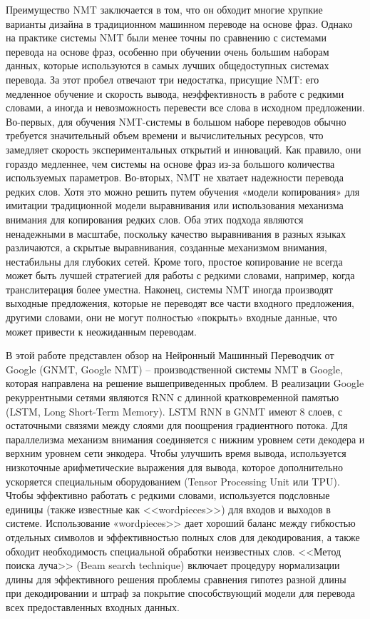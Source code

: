 \documentclass[12pt, a4paper]{article}
\begin{document}
        Преимущество NMT заключается в том, что он обходит многие хрупкие варианты дизайна в традиционном машинном переводе на основе фраз. Однако на практике системы NMT были менее точны по сравнению с системами перевода на основе фраз, особенно при обучении очень большим наборам данных, которые используются в самых лучших общедоступных системах перевода. За этот пробел отвечают три недостатка, присущие NMT: его медленное обучение и скорость вывода, неэффективность в работе с редкими словами, а иногда и невозможность перевести все слова в исходном предложении. Во-первых, для обучения NMT-системы в большом наборе переводов обычно требуется значительный объем времени и вычислительных ресурсов, что замедляет скорость экспериментальных открытий и инноваций. Как правило, они гораздо медленнее, чем системы на основе фраз из-за большого количества используемых параметров. Во-вторых, NMT не хватает надежности перевода редких слов. Хотя это можно решить путем обучения «модели копирования» для имитации традиционной модели выравнивания или использования механизма внимания для копирования редких слов. Оба этих подхода являются ненадежными в масштабе, поскольку качество выравнивания в разных языках различаются, а скрытые выравнивания, созданные механизмом внимания, нестабильны для глубоких сетей. Кроме того, простое копирование не всегда может быть лучшей стратегией для работы с редкими словами, например, когда транслитерация более уместна. Наконец, системы NMT иногда производят выходные предложения, которые не переводят все части входного предложения, другими словами, они не могут полностью «покрыть» входные данные, что может привести к неожиданным переводам.

        В этой работе представлен обзор на Нейронный Машинный Переводчик от Google (GNMT, Google NMT) -- производственной системы NMT в Google, которая направлена на решение вышеприведенных проблем. В реализации Google рекуррентными сетями являются RNN с длинной кратковременной памятью (LSTM, Long Short-Term Memory). LSTM RNN в GNMT имеют 8 слоев, с остаточными связями между слоями для поощрения градиентного потока. Для параллелизма механизм внимания соединяется с нижним уровнем сети декодера и верхним уровнем сети энкодера. Чтобы улучшить время вывода, используется низкоточные арифметические выражения для вывода, которое дополнительно ускоряется специальным оборудованием (Tensor Processing Unit или TPU). Чтобы эффективно работать с редкими словами, используется подсловные единицы (также известные как <<wordpieces>>) для входов и выходов в системе. Использование «wordpieces>> дает хороший баланс между гибкостью отдельных символов и эффективностью полных слов для декодирования, а также обходит необходимость специальной обработки неизвестных слов. <<Метод поиска луча>> (Beam search technique) включает процедуру нормализации длины для эффективного решения проблемы сравнения гипотез разной длины при декодировании и штраф за покрытие способствующий модели для перевода всех предоставленных входных данных.
\end{document}
